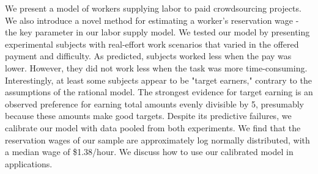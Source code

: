 \cite{benkler2011penguin}

We present a model of workers supplying labor to paid crowdsourcing projects. We also introduce a novel method for estimating a worker's reservation wage - the key parameter in our labor supply model. We tested our model by presenting experimental subjects with real-effort work scenarios that varied in the offered payment and difficulty. As predicted, subjects worked less when the pay was lower. However, they did not work less when the task was more time-consuming. Interestingly, at least some subjects appear to be "target earners," contrary to the assumptions of the rational model. The strongest evidence for target earning is an observed preference for earning total amounts evenly divisible by 5, presumably because these amounts make good targets. Despite its predictive failures, we calibrate our model with data pooled from both experiments. We find that the reservation wages of our sample are approximately log normally distributed, with a median wage of \$1.38/hour. We discuss how to use our calibrated model in applications. \cite{horton2010labor}

